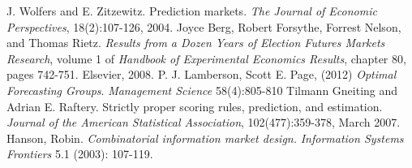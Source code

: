 \documentclass[twoside,twocolumn]{article}
\begin{document}

\begin{thebibliography}{99} %

J. Wolfers and E. Zitzewitz. Prediction markets. \textit{The Journal of Economic Perspectives},
18(2):107-126, 2004.
 Joyce Berg, Robert Forsythe, Forrest Nelson, and Thomas Rietz. \textit{Results from
a Dozen Years of Election Futures Markets Research}, volume 1 of \textit{Handbook of
Experimental Economics Results}, chapter 80, pages 742-751. Elsevier, 2008.
P. J. Lamberson, Scott E. Page, (2012) \textit{Optimal Forecasting Groups}. \textit{Management Science} 58(4):805-810
Tilmann Gneiting and Adrian E. Raftery. Strictly proper scoring rules, prediction,
and estimation. \textit{Journal of the American Statistical Association}, 102(477):359-378,
March 2007.
Hanson, Robin. \textit{Combinatorial information market design.} \textit{Information Systems Frontiers} 5.1 (2003): 107-119.

 
\end{thebibliography}

\end{document}
